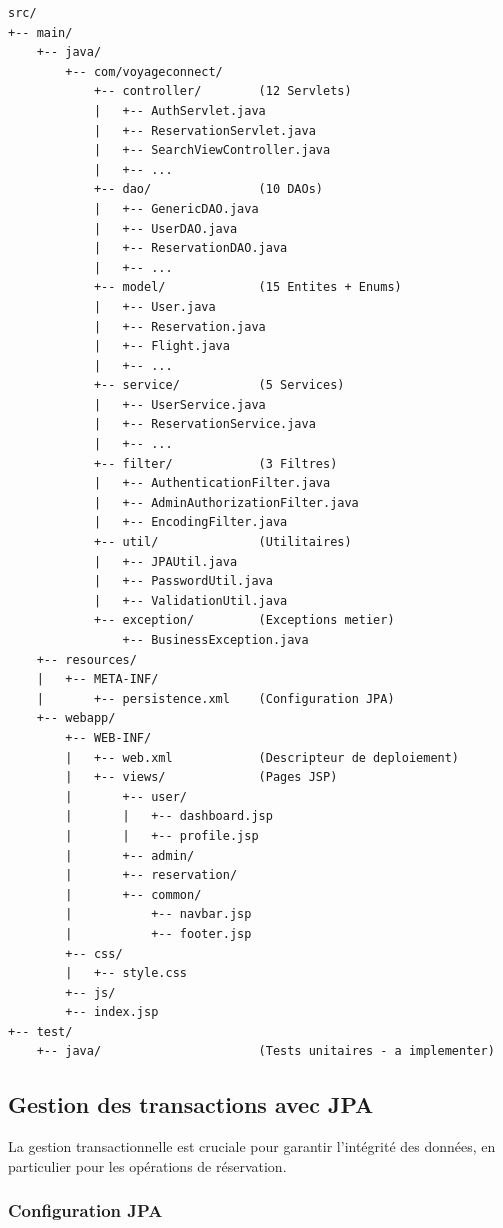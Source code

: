 \documentclass[12pt,a4paper]{report}
\begin{document}
\begin{verbatim}
src/
+-- main/
    +-- java/
        +-- com/voyageconnect/
            +-- controller/        (12 Servlets)
            |   +-- AuthServlet.java
            |   +-- ReservationServlet.java
            |   +-- SearchViewController.java
            |   +-- ...
            +-- dao/               (10 DAOs)
            |   +-- GenericDAO.java
            |   +-- UserDAO.java
            |   +-- ReservationDAO.java
            |   +-- ...
            +-- model/             (15 Entites + Enums)
            |   +-- User.java
            |   +-- Reservation.java
            |   +-- Flight.java
            |   +-- ...
            +-- service/           (5 Services)
            |   +-- UserService.java
            |   +-- ReservationService.java
            |   +-- ...
            +-- filter/            (3 Filtres)
            |   +-- AuthenticationFilter.java
            |   +-- AdminAuthorizationFilter.java
            |   +-- EncodingFilter.java
            +-- util/              (Utilitaires)
            |   +-- JPAUtil.java
            |   +-- PasswordUtil.java
            |   +-- ValidationUtil.java
            +-- exception/         (Exceptions metier)
                +-- BusinessException.java
    +-- resources/
    |   +-- META-INF/
    |       +-- persistence.xml    (Configuration JPA)
    +-- webapp/
        +-- WEB-INF/
        |   +-- web.xml            (Descripteur de deploiement)
        |   +-- views/             (Pages JSP)
        |       +-- user/
        |       |   +-- dashboard.jsp
        |       |   +-- profile.jsp
        |       +-- admin/
        |       +-- reservation/
        |       +-- common/
        |           +-- navbar.jsp
        |           +-- footer.jsp
        +-- css/
        |   +-- style.css
        +-- js/
        +-- index.jsp
+-- test/
    +-- java/                      (Tests unitaires - a implementer)
\end{verbatim}

\subsection{Gestion des transactions avec JPA}

La gestion transactionnelle est cruciale pour garantir l'intégrité des données, en particulier pour les opérations de réservation.

\subsubsection{Configuration JPA}
\end{document}

